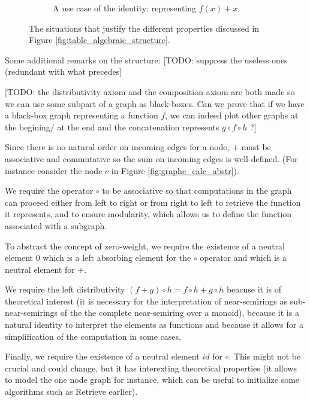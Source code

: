 \documentclass[11pt,a4paper]{article}
\theoremstyle{definition}
\begin{document}
\begin{figure}
\begin{subfigure}{\textwidth}
		\caption{A use case of the identity: representing $f(x) + x$.}
	\end{subfigure}
\caption{The situations that justify the different properties discussed in Figure \ref{fig:table_algebraic_structure}.}
\label{fig:drawings_algebraic_struct}
\end{figure}

Some additional remarks on the structure: [TODO: suppress the useless ones (redundant with what precedes]

[TODO: the distributivity axiom and the composition axiom are both made so we can use some subpart of a graph as black-boxes. Can we prove that if we have a black-box graph representing a function $f$, we can indeed plot other graphs at the begining/ at the end and the concatenation represents $g\circ  f \circ h$ ?]


	Since there is no natural order on incoming edges for a node, $+$ must be associative and commutative so the sum on incoming edges is well-defined. (For instance consider the node $c$ in Figure \ref{fig:graphe_calc_abstr}).

	We require the operator $\circ$ to be associative so that computations in the graph can proceed either from left to right or from right to left to retrieve the function it represents, and to ensure modularity, which allows us to define the function associated with a subgraph.

	To abstract the concept of zero-weight, we require the existence of a neutral element $0$ which is a left absorbing element for the $\circ$ operator and which is a neutral element for $+$.

	We require the left distributivity $(f+g) \circ h = f \circ h + g \circ h$ beacuse it is of theoretical interest (it is necessary for the interpretation of near-semirings as sub-near-semirings of the the complete near-semiring over a monoid), because it is a natural identity to interpret the elements as functions and because it allows for a simplification of the computation in some cases.

	Finally, we require the existence of a neutral element $id$ for $\circ$. This might not be crucial and could change, but it has interexting theoretical properties (it allows to model the one node graph for instance, which can be useful to initialize some algorithms such as Retrieve earlier). 
	\\
\end{document}
